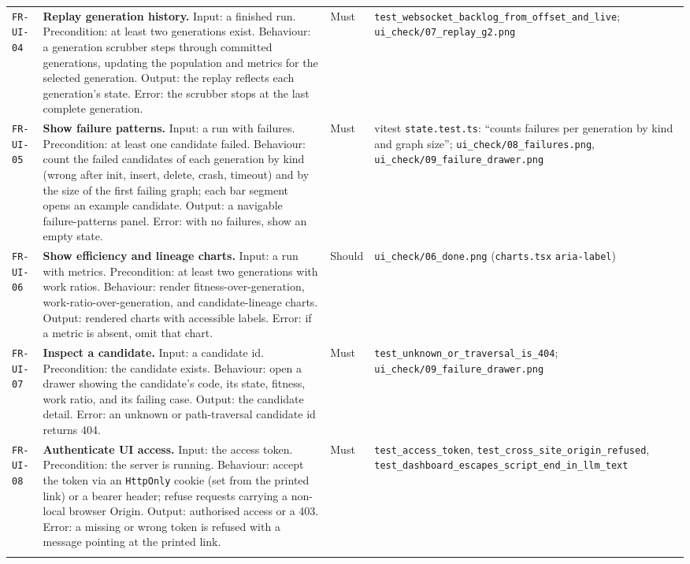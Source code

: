 \begin{longtable}{@{}>{\raggedright\arraybackslash}p{}>{\raggedright\arraybackslash}p{}p{}>{\raggedright\arraybackslash}p{}@{}}
\texttt{FR-UI-04} & \textbf{Replay generation history.} Input: a finished run.
Precondition: at least two generations exist. Behaviour: a generation scrubber
steps through committed generations, updating the population and metrics for the
selected generation. Output: the replay reflects each generation's state. Error:
the scrubber stops at the last complete generation. & Must &
\texttt{test\_websocket\_backlog\_from\_offset\_and\_live};
\texttt{ui\_check/07\_replay\_g2.png} \\
\addlinespace[2pt]

\texttt{FR-UI-05} & \textbf{Show failure patterns.} Input: a run with failures.
Precondition: at least one candidate failed. Behaviour: count the failed
candidates of each generation by kind (wrong after init, insert, delete, crash,
timeout) and by the size of the first failing graph; each bar segment opens an
example candidate. Output: a navigable failure-patterns panel. Error: with no
failures, show an empty state. & Must & vitest \texttt{state.test.ts}: ``counts
failures per generation by kind and graph size''; \texttt{ui\_check/08\_failures.png},
\texttt{ui\_check/09\_failure\_drawer.png} \\
\addlinespace[2pt]

\texttt{FR-UI-06} & \textbf{Show efficiency and lineage charts.} Input: a run
with metrics. Precondition: at least two generations with work ratios. Behaviour:
render fitness-over-generation, work-ratio-over-generation, and candidate-lineage
charts. Output: rendered charts with accessible labels. Error: if a metric is
absent, omit that chart. & Should & \texttt{ui\_check/06\_done.png}
(\texttt{charts.tsx} \texttt{aria-label}) \\
\addlinespace[2pt]

\texttt{FR-UI-07} & \textbf{Inspect a candidate.} Input: a candidate id.
Precondition: the candidate exists. Behaviour: open a drawer showing the
candidate's code, its state, fitness, work ratio, and its failing case. Output:
the candidate detail. Error: an unknown or path-traversal candidate id returns
404. & Must & \texttt{test\_unknown\_or\_traversal\_is\_404};
\texttt{ui\_check/09\_failure\_drawer.png} \\
\addlinespace[2pt]

\texttt{FR-UI-08} & \textbf{Authenticate UI access.} Input: the access token.
Precondition: the server is running. Behaviour: accept the token via an
\texttt{HttpOnly} cookie (set from the printed link) or a bearer header; refuse
requests carrying a non-local browser Origin. Output: authorised access or a
403. Error: a missing or wrong token is refused with a message pointing at the
printed link. & Must & \texttt{test\_access\_token},
\texttt{test\_cross\_site\_origin\_refused},
\texttt{test\_dashboard\_escapes\_script\_end\_in\_llm\_text} \\
\addlinespace[2pt]


\end{longtable}
